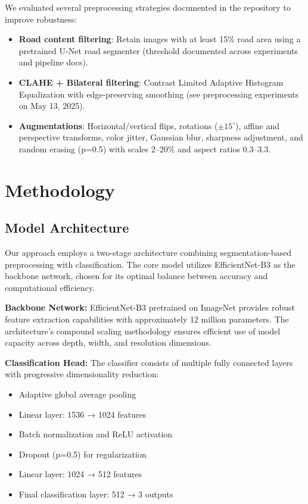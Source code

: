 \documentclass[12pt,twocolumn]{article}
\begin{document}
We evaluated several preprocessing strategies documented in the repository to improve robustness:
\begin{itemize}
\item \textbf{Road content filtering}: Retain images with at least 15\% road area using a pretrained U-Net road segmenter (threshold documented across experiments and pipeline docs).
\item \textbf{CLAHE + Bilateral filtering}: Contrast Limited Adaptive Histogram Equalization with edge-preserving smoothing (see preprocessing experiments on May 13, 2025).
\item \textbf{Augmentations}: Horizontal/vertical flips, rotations (\(\pm 15^\circ\)), affine and perspective transforms, color jitter, Gaussian blur, sharpness adjustment, and random erasing (p=0.5) with scales 2–20\% and aspect ratios 0.3–3.3.
\end{itemize}

\section{Methodology}

\subsection{Model Architecture}

Our approach employs a two-stage architecture combining segmentation-based preprocessing with classification. The core model utilizes EfficientNet-B3 as the backbone network, chosen for its optimal balance between accuracy and computational efficiency.

\textbf{Backbone Network:} EfficientNet-B3 pretrained on ImageNet provides robust feature extraction capabilities with approximately 12 million parameters. The architecture's compound scaling methodology ensures efficient use of model capacity across depth, width, and resolution dimensions.

\textbf{Classification Head:} The classifier consists of multiple fully connected layers with progressive dimensionality reduction:
\begin{itemize}
\item Adaptive global average pooling
\item Linear layer: 1536 → 1024 features
\item Batch normalization and ReLU activation
\item Dropout (p=0.5) for regularization
\item Linear layer: 1024 → 512 features
\item Final classification layer: 512 → 3 outputs
\end{itemize}
\end{document}
